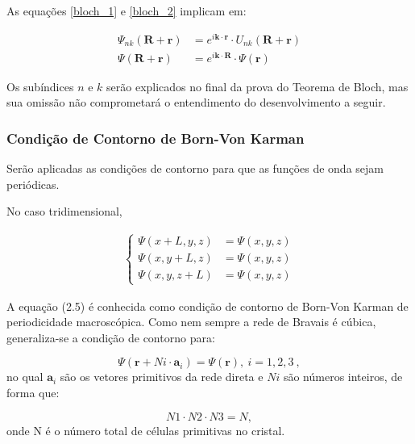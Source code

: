 	As equações \eqref{bloch_1} e \eqref{bloch_2} implicam em:

	\begin{align}
		\label{bloch_3}
		\Psi_{nk}(\mathbf{R} + \mathbf{r}) &= e^{i\mathbf{k} \cdot \mathbf{r}}\cdot U_{nk}(\mathbf{R} + \mathbf{r})\\
		\Psi(\mathbf{R} + \mathbf{r}) &= e^{i\mathbf{k} \cdot \mathbf{R}}\cdot \Psi(\mathbf{r})
	\end{align}

	\par Os subíndices $n$ e $k$ serão explicados no final da prova do Teorema de Bloch, mas sua omissão não comprometará o entendimento do desenvolvimento a seguir.



	\subsubsection{Condição de Contorno de Born-Von Karman}

		\par Serão aplicadas as condições de contorno para que as funções de onda sejam periódicas.
		
		\par No caso tridimensional,

		\begin{align}\label{bloch_4}
	        \left\{
	          \begin{array}{ll}
	            \displaystyle \Psi(x+L, y, z) &= \Psi(x, y, z)\\
	            \displaystyle \Psi(x, y+L, z) &= \Psi(x, y, z)\\
	            \displaystyle \Psi(x, y, z+L) &= \Psi(x, y, z)
	          \end{array}
	        \right.
	      \end{align}
		
		\par A equação (2.5) é conhecida como condição de contorno de Born-Von Karman de periodicidade macroscópica.  Como nem sempre a rede de Bravais é cúbica, generaliza-se a condição de contorno para:

		\begin{equation}
			\label{blochh_5}
			\Psi(\mathbf{r} + N i\cdot \mathbf{a}_{i}) = \Psi(\mathbf{r}),\ i=1,2,3\ ,
		\end{equation}
		no qual $\mathbf{a}_{i}$ são os vetores primitivos da rede direta e $Ni$ são números inteiros, de forma que:

		\begin{equation}
			\label{bloch_6}
			N1 \cdot N2 \cdot N3 = N,
		\end{equation}
		onde N é o número total de células primitivas no cristal.

